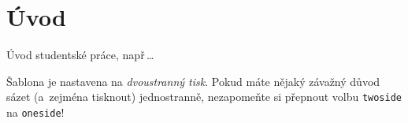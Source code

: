 \chapter*{Úvod}
{}


Úvod studentské práce, např\,\dots

Šablona je nastavena na \emph{dvoustranný tisk}. Pokud máte nějaký závažný důvod sázet (a~zejména tisknout) jednostranně, nezapomeňte si přepnout volbu \texttt{twoside} na \texttt{oneside}!